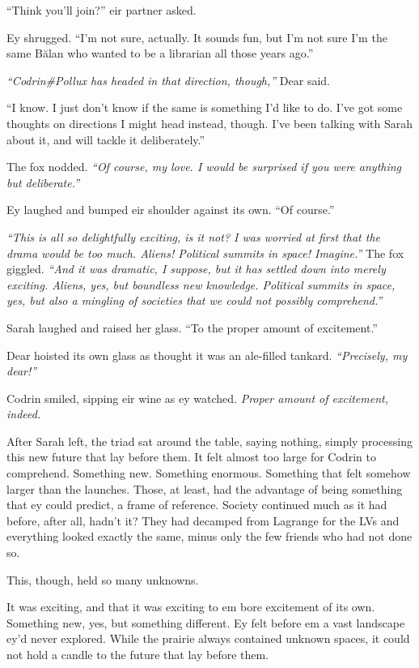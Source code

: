 ``Think you'll join?'' eir partner asked.

Ey shrugged. ``I'm not sure, actually. It sounds fun, but I'm not sure I'm the same Bălan who wanted to be a librarian all those years ago.''

\emph{``Codrin\#Pollux has headed in that direction, though,''} Dear said.

``I know. I just don't know if the same is something I'd like to do. I've got some thoughts on directions I might head instead, though. I've been talking with Sarah about it, and will tackle it deliberately.''

The fox nodded. \emph{``Of course, my love. I would be surprised if you were anything but deliberate.''}

Ey laughed and bumped eir shoulder against its own. ``Of course.''

\emph{``This is all so delightfully exciting, is it not? I was worried at first that the drama would be too much. Aliens! Political summits in space! Imagine.''} The fox giggled. \emph{``And it was dramatic, I suppose, but it has settled down into merely exciting. Aliens, yes, but boundless new knowledge. Political summits in space, yes, but also a mingling of societies that we could not possibly comprehend.''}

Sarah laughed and raised her glass. ``To the proper amount of excitement.''

Dear hoisted its own glass as thought it was an ale-filled tankard. \emph{``Precisely, my dear!''}

Codrin smiled, sipping eir wine as ey watched. \emph{Proper amount of excitement, indeed.}

After Sarah left, the triad sat around the table, saying nothing, simply processing this new future that lay before them. It felt almost too large for Codrin to comprehend. Something new. Something enormous. Something that felt somehow larger than the launches. Those, at least, had the advantage of being something that ey could predict, a frame of reference. Society continued much as it had before, after all, hadn't it? They had decamped from Lagrange for the LVs and everything looked exactly the same, minus only the few friends who had not done so.

This, though, held so many unknowns.

It was exciting, and that it was exciting to em bore excitement of its own. Something new, yes, but something different. Ey felt before em a vast landscape ey'd never explored. While the prairie always contained unknown spaces, it could not hold a candle to the future that lay before them.


